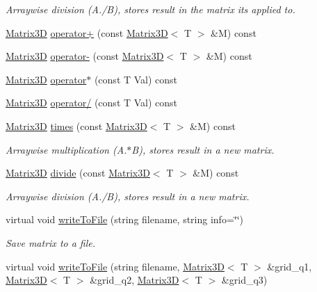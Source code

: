 \begin{DoxyCompactItemize}
\begin{DoxyCompactList}\small\item\em Arraywise division (A./\+B), stores result in the matrix it\textquotesingle{}s applied to. \end{DoxyCompactList}\item 
\hyperlink{class_matrix3_d}{Matrix3\+D} \hyperlink{class_matrix3_d_a6fc700597fd5050e0f76e48fbe4d0de0}{operator+} (const \hyperlink{class_matrix3_d}{Matrix3\+D}$<$ T $>$ \&M) const 
\item 
\hyperlink{class_matrix3_d}{Matrix3\+D} \hyperlink{class_matrix3_d_ae383b01a3aa6746ee6dc92f3f97fcb88}{operator-\/} (const \hyperlink{class_matrix3_d}{Matrix3\+D}$<$ T $>$ \&M) const 
\item 
\hyperlink{class_matrix3_d}{Matrix3\+D} \hyperlink{class_matrix3_d_ac853c4dbe59b6ff30fec5880a455079b}{operator$\ast$} (const T Val) const 
\item 
\hyperlink{class_matrix3_d}{Matrix3\+D} \hyperlink{class_matrix3_d_abd2071b30314555bf306d02b44adf4c9}{operator/} (const T Val) const 
\item 
\hyperlink{class_matrix3_d}{Matrix3\+D} \hyperlink{class_matrix3_d_a6ffde505058b7de9b3075aea28694a41}{times} (const \hyperlink{class_matrix3_d}{Matrix3\+D}$<$ T $>$ \&M) const 
\begin{DoxyCompactList}\small\item\em Arraywise multiplication (A.$\ast$\+B), stores result in a new matrix. \end{DoxyCompactList}\item 
\hyperlink{class_matrix3_d}{Matrix3\+D} \hyperlink{class_matrix3_d_a62ddd2402b078e9df43daa85aa7f8709}{divide} (const \hyperlink{class_matrix3_d}{Matrix3\+D}$<$ T $>$ \&M) const 
\begin{DoxyCompactList}\small\item\em Arraywise division (A./\+B), stores result in a new matrix. \end{DoxyCompactList}\item 
virtual void \hyperlink{class_matrix3_d_a945ea3926bf746e3fd7aa076fd59c9bd}{write\+To\+File} (string filename, string info=\char`\"{}\char`\"{})
\begin{DoxyCompactList}\small\item\em Save matrix to a file. \end{DoxyCompactList}\item 
virtual void \hyperlink{class_matrix3_d_a3dd887d97ab2260d9d354c8e127ff617}{write\+To\+File} (string filename, \hyperlink{class_matrix3_d}{Matrix3\+D}$<$ T $>$ \&grid\+\_\+q1, \hyperlink{class_matrix3_d}{Matrix3\+D}$<$ T $>$ \&grid\+\_\+q2, \hyperlink{class_matrix3_d}{Matrix3\+D}$<$ T $>$ \&grid\+\_\+q3)

\end{DoxyCompactItemize}
